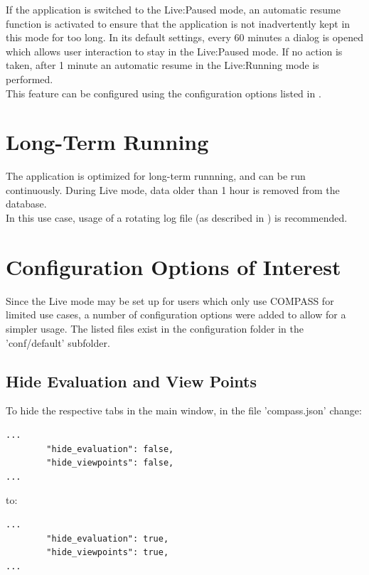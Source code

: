 If the application is switched to the Live:Paused mode, an automatic resume function is activated to ensure that the application is not inadvertently kept in this mode for too long. In its default settings, every 60 minutes a dialog is opened which allows user interaction to stay in the Live:Paused mode. If no action is taken, after 1 minute an automatic resume in the Live:Running mode is performed. \\

This feature can be configured using the configuration options listed in .

\section{Long-Term Running}

The application is optimized for long-term runnning, and can be run continuously. During Live mode, data older than 1 hour is removed from the database. \\

In this use case, usage of a rotating log file (as described in ) is recommended.

\section{Configuration Options of Interest}

Since the Live mode may be set up for users which only use COMPASS for limited use cases, a number of configuration options were added to allow for a simpler usage. The listed files exist in the configuration folder in the 'conf/default' subfolder.

\subsection{Hide Evaluation and View Points}

To hide the respective tabs in the main window, in the file 'compass.json' change:

\begin{lstlisting}
...
        "hide_evaluation": false,
        "hide_viewpoints": false,
...        
\end{lstlisting}

to:
\begin{lstlisting}
...
        "hide_evaluation": true,
        "hide_viewpoints": true,
...        
\end{lstlisting}

